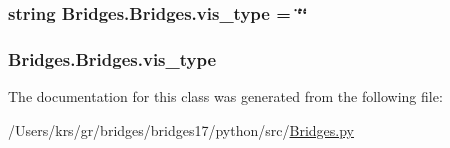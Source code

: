 \subsubsection[{vis\+\_\+type}]{\setlength{\rightskip}{0pt plus 5cm}string Bridges.\+Bridges.\+vis\+\_\+type = \char`\"{}\char`\"{}\hspace{0.3cm}{\ttfamily [static]}}\label{class_bridges_1_1_bridges_a96486bc6649d90a5511a7a1bdd3d1701}
\hypertarget{class_bridges_1_1_bridges_ad5c38f63f0d78fcc5b030fe37f13d3fc}{}
\subsubsection[{vis\+\_\+type}]{\setlength{\rightskip}{0pt plus 5cm}Bridges.\+Bridges.\+vis\+\_\+type}\label{class_bridges_1_1_bridges_ad5c38f63f0d78fcc5b030fe37f13d3fc}


The documentation for this class was generated from the following file\+:\begin{DoxyCompactItemize}
\item 
/\+Users/krs/gr/bridges/bridges17/python/src/\hyperlink{_bridges_8py}{Bridges.\+py}\end{DoxyCompactItemize}
